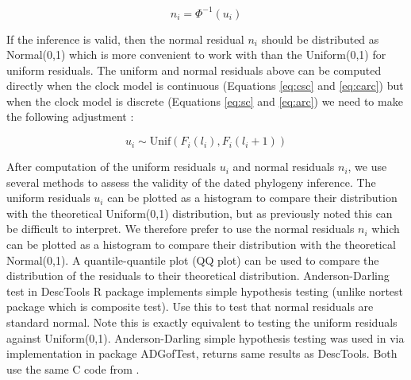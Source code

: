\documentclass{article}
\begin{document}
\begin{equation}
n_i=\Phi^{-1}(u_i)
\label{eq:norm-resid}
\end{equation}

If the inference is valid, then the normal residual $n_i$ should be distributed
as Normal(0,1) which is more convenient to work with than the Uniform(0,1) for uniform residuals.
The uniform and normal residuals above can be computed directly
when the clock model is continuous (Equations \ref{eq:csc} and \ref{eq:carc}) but when
the clock model is discrete (Equations \ref{eq:sc} and \ref{eq:arc}) we need to make the following
adjustment \citep{dunnRandomizedQuantileResiduals1996,brockwellUniversalResidualsMultivariate2007,lauNewModelDiagnostics2014}:

\begin{equation}
u_i \sim \mathrm{Unif}(F_i(l_i),F_i(l_i+1))
\end{equation}

After computation of the uniform residuals $u_i$ and normal residuals $n_i$,
we use several methods to assess the validity of the dated phylogeny inference.
The uniform residuals $u_i$ can be plotted as a histogram to compare their
distribution with the theoretical Uniform(0,1) distribution, but as previously noted this can
be difficult to interpret. We therefore prefer to use the normal residuals $n_i$ which can be plotted
as a histogram to compare their distribution with the theoretical Normal(0,1).
A quantile-quantile plot (QQ plot) can be used to compare the distribution of the residuals
to their theoretical distribution.
Anderson-Darling test \citep{lewis1961distribution} 
in DescTools R package implements simple hypothesis testing
(unlike nortest package which is composite test). Use this to test that normal residuals
are standard normal.   
Note this is exactly equivalent to testing the uniform residuals against Uniform(0,1).
Anderson-Darling simple hypothesis testing was used in \citep{lauNewModelDiagnostics2014} via implementation in package ADGofTest, returns same results as DescTools. Both use the same C code from \citep{marsagliaEvaluatingAndersonDarlingDistribution2004}. 
\end{document}
